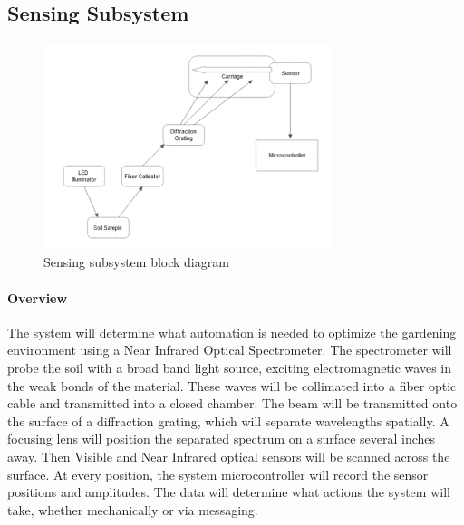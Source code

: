 \subsection{Sensing Subsystem}
\begin{figure}[H]
    \caption{Sensing subsystem block diagram}
    \centering
    \includegraphics[width=0.75\textwidth]{images/OpticsBlockDiagram.png}
\end{figure}


\paragraph{Overview} The system will determine what automation is needed to optimize the gardening environment using a Near Infrared Optical Spectrometer. The spectrometer will probe the soil with a broad band light source, exciting electromagnetic waves in the weak bonds of the material. These waves will be collimated into a fiber optic cable and transmitted into a closed chamber. The beam will be transmitted onto the surface of a diffraction grating, which will separate wavelengths spatially. A focusing lens will position the separated spectrum on a surface several inches away. Then Visible and Near Infrared optical sensors will be scanned across the surface. At every position, the system microcontroller will record the sensor positions and amplitudes. The data will determine what actions the system will take, whether mechanically or via messaging.

